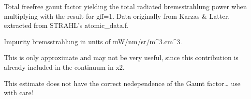 \documentclass[letterpaper,10pt,english]{sphinxmanual}
\begin{document}

\begin{fulllineitems}
\label{\detokenize{aurora:aurora.atomic.gff_mean}}
Total free\sphinxhyphen{}free gaunt factor yielding the total radiated bremsstrahlung power
when multiplying with the result for gff=1.
Data originally from Karzas \& Latter, extracted from STRAHL’s atomic\_data.f.

\end{fulllineitems}


\begin{fulllineitems}
\label{\detokenize{aurora:aurora.atomic.impurity_brems}}
Impurity bremsstrahlung in units of mW/nm/sr/m\textasciicircum{}3.cm\textasciicircum{}3.

This is only approximate and may not be very useful, since this contribution
is already included in the continuum in x2.

This estimate does not have the correct ne\sphinxhyphen{}dependence of the Gaunt factor… use with care!

\end{fulllineitems}

\end{document}
